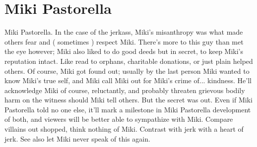 \documentclass[12pt]{book}
\begin{document}
\chapter{Miki Pastorella}

Miki Pastorella. In the case of the jerkass, Miki's misanthropy was what made others fear and ( sometimes ) respect Miki. There's more to this guy than met the eye however; Miki also liked to do good deeds but in secret, to keep Miki's reputation intact. Like read to orphans, charitable donations, or just plain helped others. Of course, Miki got found out; usually by the last person Miki wanted to know Miki's true self, and Miki call Miki out for Miki's crime of... kindness. He'll acknowledge Miki of course, reluctantly, and probably threaten grievous bodily harm on the witness should Miki tell others. But the secret was out. Even if Miki Pastorella told no one else, it'll mark a milestone in Miki Pastorella development of both, and viewers will be better able to sympathize with Miki. Compare villains out shopped, think nothing of Miki. Contrast with jerk with a heart of jerk. See also let Miki never speak of this again.
\end{document}
